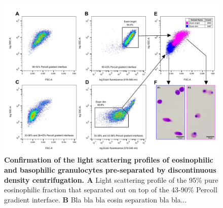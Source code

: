 \begin{figure}[!ht]
    \centering
    \includegraphics[width=1.0\textwidth]{figures/Eosin and Percoll exp/Percoll sep for Inkscape 2.pdf}
    \caption{\textbf{Confirmation of the light scattering profiles of eosinophilic and basophilic granulocytes pre-separated by discontinuous density centrifugation. A} Light scattering profile of the 95\% pure eosinophilic fraction that separated out on top of the 43-90\% Percoll gradient interface. \textbf{B} Bla bla bla eosin separation bla bla...}
    \label{fig:Percoll-dotplots}
\end{figure}







